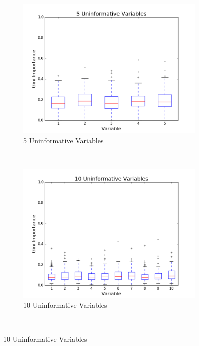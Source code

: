 \begin{figure}[H]
  \centering
  \caption{VARIABLE IMPORTANCES FOR DIFFERENT VARIABLE COUNTS}
  \begin{subfigure}[b]{0.45\textwidth}
    \includegraphics[width=\textwidth]{figures/random_forests/rf_variable_count_bias_5.png}
    \caption{5 Uninformative Variables}
    \label{fig:var-count-5}
  \end{subfigure}
  ~
  \begin{subfigure}[b]{0.45\textwidth}
    \includegraphics[width=\textwidth]{figures/random_forests/rf_variable_count_bias_10.png}
    \caption{10 Uninformative Variables}
    \label{fig:var-count-10}
  \end{subfigure}
  ~

\end{figure}
